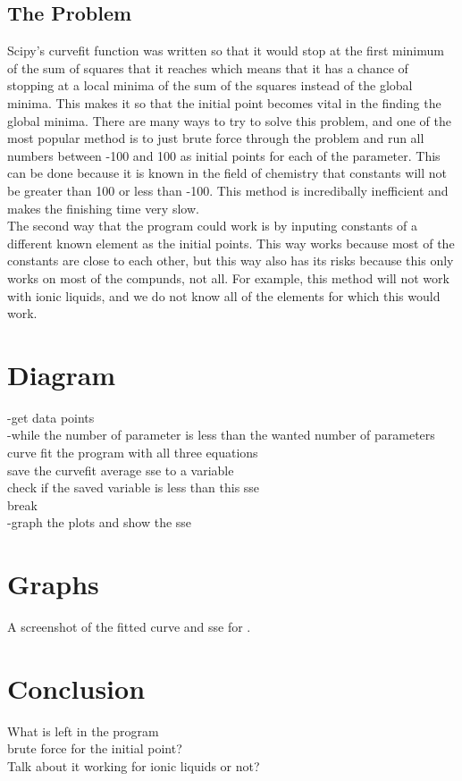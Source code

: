 \documentclass{article}
\begin{document}
\begin{singlespacing}
\subsection*{The Problem}
\indent Scipy's curvefit function was written so that it would stop at the first minimum of the sum of squares that it reaches which means that it has a chance of stopping at a local minima of the sum of the squares instead of the global minima. This makes it so that the initial point becomes vital in the finding the global minima. There are many ways to try to solve this problem, and one of the most popular method is to just brute force through the problem and run all numbers between -100 and 100 as initial points for each of the parameter. This can be done because it is known in the field of chemistry that constants will not be greater than 100 or less than -100. This method is incredibally inefficient and makes the finishing time very slow.\\
\indent The second way that the program could work is by inputing constants of a different known element as the initial points. This way works because most of the constants are close to each other, but this way also has its risks because this only works on most of the compunds, not all. For example, this method will not work with ionic liquids, and we do not know all of the elements for which this would work.

\section*{Diagram}
-get data points\\
-while the number of parameter is less than the wanted number of parameters\\
\indent curve fit the program with all three equations\\
\indent save the curvefit average sse to a variable\\
\indent check if the saved variable is less than this sse\\
\indent \indent break\\
-graph the plots and show the sse

\section*{Graphs}
A screenshot of the fitted curve and sse for .

\section*{Conclusion}
What is left in the program\\
brute force for the initial point?\\
Talk about it working for ionic liquids or not?\\
\end{singlespacing}
\end{document}
